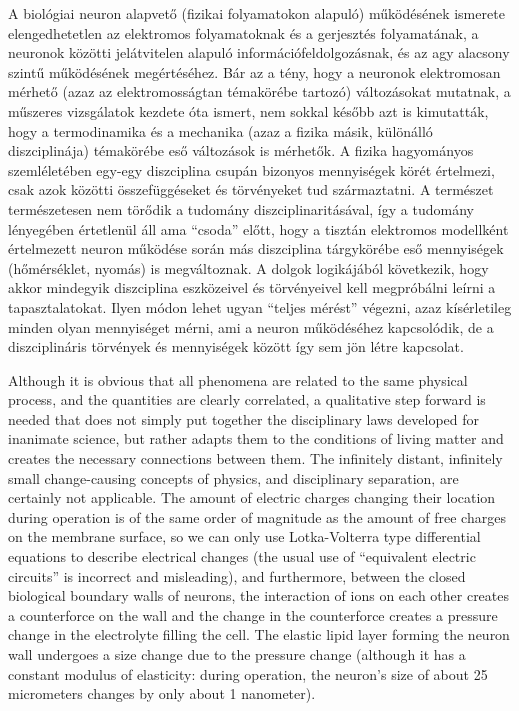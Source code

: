 A biológiai neuron alapvető (fizikai folyamatokon alapuló) működésének ismerete elengedhetetlen az elektromos folyamatoknak és a gerjesztés folyamatának, a neuronok közötti jelátvitelen alapuló információfeldolgozásnak, és az agy alacsony szintű működésének megértéséhez. Bár az a tény, hogy a neuronok elektromosan mérhető (azaz az elektromosságtan témakörébe tartozó) változásokat mutatnak, a műszeres vizsgálatok kezdete óta ismert, nem sokkal később azt is kimutatták, hogy a termodinamika és a mechanika (azaz a fizika másik, különálló diszciplinája) témakörébe eső változások is mérhetők. A fizika hagyományos szemléletében egy-egy diszciplina csupán bizonyos  mennyi\-ségek körét értelmezi, csak azok közötti összefüggéseket és törvényeket tud származtatni. A természet természetesen nem törődik a tudomány diszciplinaritásával, így a tudomány lényegében értetlenül áll ama “csoda” előtt, hogy a tisztán elektromos modellként értelmezett neuron működése során más diszciplina tárgykörébe eső mennyiségek (hőmérséklet, nyomás) is megváltoznak. A dolgok logikájából következik, hogy akkor mindegyik diszciplina eszközeivel és törvényeivel kell megpróbálni leírni a tapasztalatokat. Ilyen módon lehet ugyan “teljes mérést” végezni, 
azaz kísérletileg minden olyan mennyiséget mérni, ami a neuron működéséhez kapcsolódik, de a diszciplináris törvények és mennyiségek között így sem jön létre kapcsolat.
\fi

\ifx\magyar\undefined
Although it is obvious that all phenomena are related to the same physical process, and the quantities are clearly correlated, a qualitative step forward is needed that does not simply put together the disciplinary laws developed for inanimate science, but rather adapts them to the conditions of living matter and creates the necessary connections between them. The infinitely distant, infinitely small change-causing concepts of physics, and disciplinary separation, are certainly not applicable. The amount of electric charges changing their location during operation is of the same order of magnitude as the amount of free charges on the membrane surface, so we can only use Lotka-Volterra type differential equations
to describe electrical changes (the usual use of “equivalent electric circuits” is incorrect and misleading), and furthermore, between the closed biological boundary walls of neurons, the interaction of ions on each other creates a counterforce on the wall and the change in the counterforce creates a pressure change in the electrolyte filling the cell. The elastic lipid layer forming the neuron wall undergoes a size change due to the pressure change (although it has a constant modulus of elasticity: during operation, the neuron’s size of about 25 micrometers changes by only about 1 nanometer).

